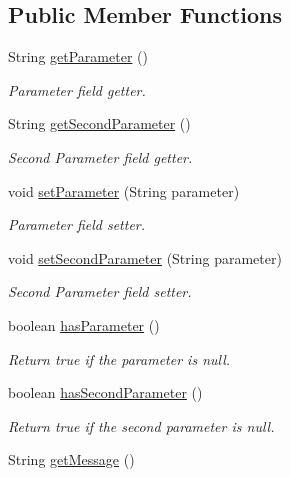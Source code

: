 \subsection*{Public Member Functions}
\begin{DoxyCompactItemize}
\item 
String \hyperlink{classpkg__commands_1_1Command_a41c92d445be73ea9d62320c65efb8434}{get\-Parameter} ()
\begin{DoxyCompactList}\small\item\em Parameter field getter. \end{DoxyCompactList}\item 
String \hyperlink{classpkg__commands_1_1Command_a20d3ebdc0683a87b43be2a92a1cad111}{get\-Second\-Parameter} ()
\begin{DoxyCompactList}\small\item\em Second Parameter field getter. \end{DoxyCompactList}\item 
void \hyperlink{classpkg__commands_1_1Command_a18446243a5fd360e9341b4b141c0cccc}{set\-Parameter} (String parameter)
\begin{DoxyCompactList}\small\item\em Parameter field setter. \end{DoxyCompactList}\item 
void \hyperlink{classpkg__commands_1_1Command_af6de3828c27cd491ad24c4a97d69e856}{set\-Second\-Parameter} (String parameter)
\begin{DoxyCompactList}\small\item\em Second Parameter field setter. \end{DoxyCompactList}\item 
boolean \hyperlink{classpkg__commands_1_1Command_a02af95ab3f1898a66259ab7c177b6998}{has\-Parameter} ()
\begin{DoxyCompactList}\small\item\em Return true if the parameter is null. \end{DoxyCompactList}\item 
boolean \hyperlink{classpkg__commands_1_1Command_add688a76d80576c34f23927da19b9e2d}{has\-Second\-Parameter} ()
\begin{DoxyCompactList}\small\item\em Return true if the second parameter is null. \end{DoxyCompactList}\item 
String \hyperlink{classpkg__commands_1_1Command_ac2a42e2bab264821892daefaf9a18b6c}{get\-Message} ()

\end{DoxyCompactItemize}
